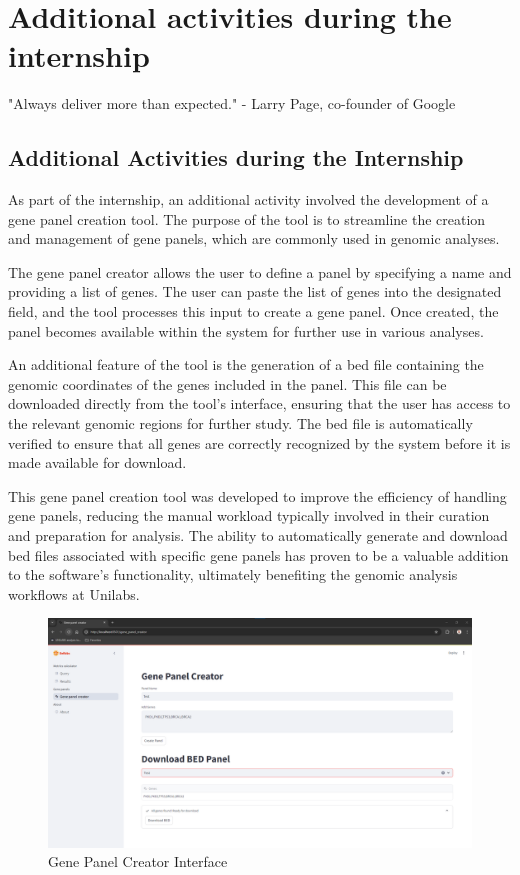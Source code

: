 \chapter{Additional activities during the internship}
\label{chapter:Additional activities during the internship}

\begin{introduction}
    "Always deliver more than expected." - Larry Page, co-founder of Google
\end{introduction}


\section{Additional Activities during the Internship}

As part of the internship, an additional activity involved the development of a gene panel creation tool. The purpose of the tool is to streamline the creation and management of gene panels, which are commonly used in genomic analyses.

The gene panel creator allows the user to define a panel by specifying a name and providing a list of genes. The user can paste the list of genes into the designated field, and the tool processes this input to create a gene panel. Once created, the panel becomes available within the system for further use in various analyses.

An additional feature of the tool is the generation of a \ac{bed} file containing the genomic coordinates of the genes included in the panel. This file can be downloaded directly from the tool's interface, ensuring that the user has access to the relevant genomic regions for further study. The \ac{bed} file is automatically verified to ensure that all genes are correctly recognized by the system before it is made available for download.

This gene panel creation tool was developed to improve the efficiency of handling gene panels, reducing the manual workload typically involved in their curation and preparation for analysis. The ability to automatically generate and download \ac{bed} files associated with specific gene panels has proven to be a valuable addition to the software's functionality, ultimately benefiting the genomic analysis workflows at Unilabs.

\begin{figure}[H]
    \centering
    \includegraphics[width=\textwidth]{figs/v3.13.png}
    \caption{Gene Panel Creator Interface}
    \label{fig:gene_panel_creator}
\end{figure}
